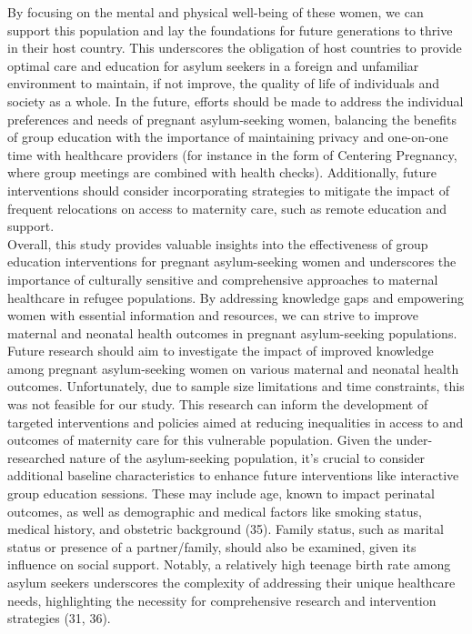 \documentclass[12pt]{article}
\begin{document}
\noindent By focusing on the mental and physical well-being of these women, we can support this population and lay the foundations for future generations to thrive in their host country. This underscores the obligation of host countries to provide optimal care and education for asylum seekers in a foreign and unfamiliar environment to maintain, if not improve, the quality of life of individuals and society as a whole. In the future, efforts should be made to address the individual preferences and needs of pregnant asylum-seeking women, balancing the benefits of group education with the importance of maintaining privacy and one-on-one time with healthcare providers (for instance in the form of Centering Pregnancy, where group meetings are combined with health checks). Additionally, future interventions should consider incorporating strategies to mitigate the impact of frequent relocations on access to maternity care, such as remote education and support. \\

\noindent Overall, this study provides valuable insights into the effectiveness of group education interventions for pregnant asylum-seeking women and underscores the importance of culturally sensitive and comprehensive approaches to maternal healthcare in refugee populations. By addressing knowledge gaps and empowering women with essential information and resources, we can strive to improve maternal and neonatal health outcomes in pregnant asylum-seeking populations. \\

\noindent Future research should aim to investigate the impact of improved knowledge among pregnant asylum-seeking women on various maternal and neonatal health outcomes.  Unfortunately, due to sample size limitations and time constraints, this was not feasible for our study. This research can inform the development of targeted interventions and policies aimed at reducing inequalities in access to and outcomes of maternity care for this vulnerable population. Given the under-researched nature of the asylum-seeking population, it's crucial to consider additional baseline characteristics to enhance future interventions like interactive group education sessions. These may include age, known to impact perinatal outcomes, as well as demographic and medical factors like smoking status, medical history, and obstetric background (35).  Family status, such as marital status or presence of a partner/family, should also be examined, given its influence on social support. Notably, a relatively high teenage birth rate among asylum seekers underscores the complexity of addressing their unique healthcare needs, highlighting the necessity for comprehensive research and intervention strategies (31, 36). \\
\end{document}
